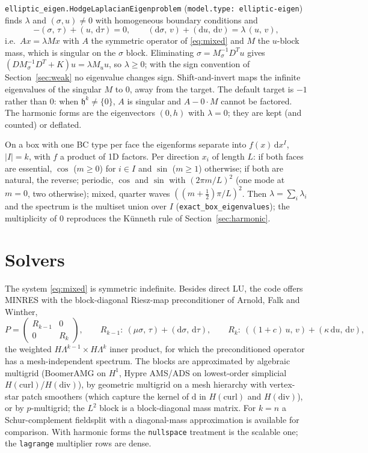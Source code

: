 \documentclass[11pt]{article}
\newcommand{\dd}{\mathrm{d}}
\newcommand{\Hspace}{\mathfrak{h}}
\newcommand{\code}[1]{\texttt{#1}}
\newcommand{\ip}[2]{\left(#1,\,#2\right)}
\theoremstyle{remark}
\begin{document}
\code{elliptic\_eigen.HodgeLaplacianEigenproblem} (\code{model.type: elliptic-eigen}) finds
$\lambda$ and $(\sigma,u)\neq0$ with homogeneous boundary conditions and
\[
  -\ip{\sigma}{\tau} + \ip{u}{\dd\tau} = 0, \qquad
  \ip{\dd\sigma}{v} + \ip{\dd u}{\dd v} = \lambda\,\ip{u}{v},
\]
i.e.\ $Ax=\lambda Mx$ with $A$ the symmetric operator of \eqref{eq:mixed} and $M$ the $u$-block mass,
which is singular on the $\sigma$ block. Eliminating $\sigma=M_\sigma^{-1}D^T u$ gives
$(DM_\sigma^{-1}D^T+K)u=\lambda M_u u$, so $\lambda\ge0$; with the sign convention of
Section~\ref{sec:weak} no eigenvalue changes sign. Shift-and-invert maps the infinite eigenvalues of the
singular $M$ to $0$, away from the target. The default target is $-1$ rather than $0$: when
$\Hspace^k\neq\{0\}$, $A$ is singular and $A-0\cdot M$ cannot be factored. The harmonic forms are the
eigenvectors $(0,h)$ with $\lambda=0$; they are kept (and counted) or deflated.

On a box with one BC type per face the eigenforms separate into $f(x)\,\dd x^I$, $|I|=k$, with $f$ a
product of 1D factors. Per direction $x_i$ of length $L$: if both faces are essential, $\cos$ ($m\ge0$)
for $i\in I$ and $\sin$ ($m\ge1$) otherwise; if both are natural, the reverse; periodic, $\cos$ and $\sin$
with $(2\pi m/L)^2$ (one mode at $m=0$, two otherwise); mixed, quarter waves $((m+\tfrac12)\pi/L)^2$.
Then $\lambda=\sum_i\lambda_i$ and the spectrum is the multiset union over $I$
(\code{exact\_box\_eigenvalues}); the multiplicity of $0$ reproduces the K\"unneth rule of
Section~\ref{sec:harmonic}.

\section{Solvers}\label{sec:solvers}

The system \eqref{eq:mixed} is symmetric indefinite. Besides direct LU, the code offers MINRES with the
block-diagonal Riesz-map preconditioner of Arnold, Falk and Winther,
\[
  P=\begin{pmatrix}R_{k-1}&0\\0&R_k\end{pmatrix},\qquad
  R_{k-1}:\ \ip{\mu\sigma}{\tau}+\ip{\dd\sigma}{\dd\tau},\qquad
  R_k:\ \ip{(1+c)\,u}{v}+\ip{\kappa\,\dd u}{\dd v},
\]
the weighted $H\Lambda^{k-1}\times H\Lambda^k$ inner product, for which the preconditioned operator has a
mesh-independent spectrum. The blocks are approximated by algebraic multigrid (BoomerAMG on $H^1$, Hypre
AMS/ADS on lowest-order simplicial $H(\mathrm{curl})$/$H(\mathrm{div})$), by geometric multigrid on a mesh
hierarchy with vertex-star patch smoothers (which capture the kernel of $\dd$ in $H(\mathrm{curl})$ and
$H(\mathrm{div})$), or by $p$-multigrid; the $L^2$ block is a block-diagonal mass matrix. For $k=n$ a
Schur-complement fieldsplit with a diagonal-mass approximation is available for comparison. With harmonic
forms the \code{nullspace} treatment is the scalable one; the \code{lagrange} multiplier rows are dense.
\end{document}
